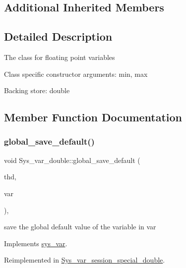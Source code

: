 \subsection*{Additional Inherited Members}


\subsection{Detailed Description}
The class for floating point variables

Class specific constructor arguments\+: min, max

Backing store\+: double 

\subsection{Member Function Documentation}
\mbox{\label{classSys__var__double_a4c08f551e54b822ef9fccdc9b8c75517}} 
\subsubsection{\texorpdfstring{global\+\_\+save\+\_\+default()}{global\_save\_default()}}
{\footnotesize\ttfamily void Sys\+\_\+var\+\_\+double\+::global\+\_\+save\+\_\+default (\begin{DoxyParamCaption}\item[{T\+HD $\ast$}]{thd,  }\item[{\mbox{\hyperlink{classset__var}{set\+\_\+var}} $\ast$}]{var }\end{DoxyParamCaption})\hspace{0.3cm}{\ttfamily [inline]}, {\ttfamily [virtual]}}

save the global default value of the variable in var 

Implements \mbox{\hyperlink{classsys__var}{sys\+\_\+var}}.



Reimplemented in \mbox{\hyperlink{classSys__var__session__special__double_a51caca194ef88ed7c473afa332c43b1a}{Sys\+\_\+var\+\_\+session\+\_\+special\+\_\+double}}.

\mbox{\label{classSys__var__double_a11ba42d3f6f65a0bf3dcaf4e2d8d1d22}} 
